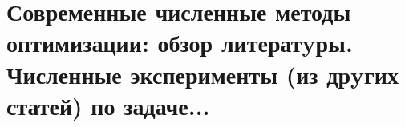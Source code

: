 \chapter{Современные численные методы оптимизации: обзор литератyры. Численные эксперименты (из дрyгих статей) по задаче...}\label{ch:ch1}

\FloatBarrier
